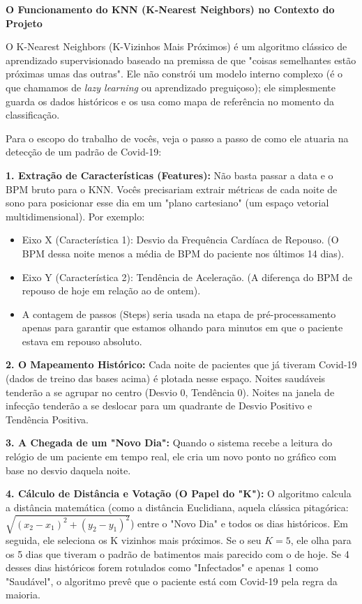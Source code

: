 \begin{description}
    \textbf{O Funcionamento do KNN (K-Nearest Neighbors) no Contexto do Projeto}

    O K-Nearest Neighbors (K-Vizinhos Mais Próximos) é um algoritmo clássico de aprendizado supervisionado baseado na premissa de que "coisas semelhantes estão próximas umas das outras". Ele não constrói um modelo interno complexo (é o que chamamos de \textit{lazy learning} ou aprendizado preguiçoso); ele simplesmente guarda os dados históricos e os usa como mapa de referência no momento da classificação.

    Para o escopo do trabalho de vocês, veja o passo a passo de como ele atuaria na detecção de um padrão de Covid-19:

    \textbf{1. Extração de Características (Features):}
    Não basta passar a data e o BPM bruto para o KNN. Vocês precisariam extrair métricas de cada noite de sono para posicionar esse dia em um "plano cartesiano" (um espaço vetorial multidimensional). Por exemplo:

    \begin{itemize}
        \item Eixo X (Característica 1): Desvio da Frequência Cardíaca de Repouso. (O BPM dessa noite menos a média de BPM do paciente nos últimos 14 dias).
        \item Eixo Y (Característica 2): Tendência de Aceleração. (A diferença do BPM de repouso de hoje em relação ao de ontem).
        \item A contagem de passos (Steps) seria usada na etapa de pré-processamento apenas para garantir que estamos olhando para minutos em que o paciente estava em repouso absoluto.
    \end{itemize}

    \textbf{2. O Mapeamento Histórico:}
    Cada noite de pacientes que já tiveram Covid-19 (dados de treino das bases acima) é plotada nesse espaço. Noites saudáveis tenderão a se agrupar no centro (Desvio 0, Tendência 0). Noites na janela de infecção tenderão a se deslocar para um quadrante de Desvio Positivo e Tendência Positiva.

    \textbf{3. A Chegada de um "Novo Dia":}
    Quando o sistema recebe a leitura do relógio de um paciente em tempo real, ele cria um novo ponto no gráfico com base no desvio daquela noite.

    \textbf{4. Cálculo de Distância e Votação (O Papel do "K"):}
    O algoritmo calcula a distância matemática (como a distância Euclidiana, aquela clássica pitagórica: 
    $\sqrt{(x_2-x_1)^2 + (y_2-y_1)^2}$) entre o "Novo Dia" e todos os dias históricos.
    Em seguida, ele seleciona os K vizinhos mais próximos. Se o seu $K = 5$, ele olha para os 5 dias que tiveram o padrão de batimentos mais parecido com o de hoje. Se 4 desses dias históricos forem rotulados como "Infectados" e apenas 1 como "Saudável", o algoritmo prevê que o paciente está com Covid-19 pela regra da maioria.


\end{description}
